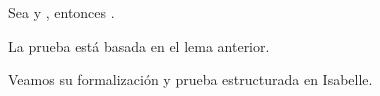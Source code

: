 \begin{isabellebody}
\begin{isamarkuptext}

  \begin{lema}
    Sea  y , entonces .
  \end{lema}


  \begin{demostracion}
  La prueba está basada en el lema anterior. 
  \end{demostracion}

  Veamos su formalización y prueba estructurada en Isabelle.


\end{isamarkuptext}
\end{isabellebody}
